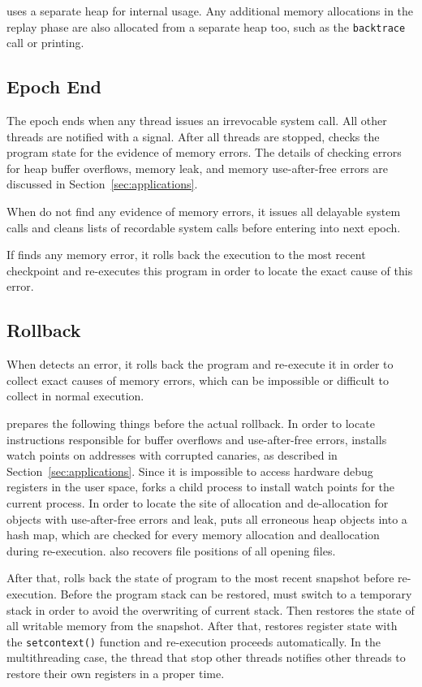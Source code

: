 \doubletake{} uses a separate heap for internal usage. Any additional memory allocations in the replay phase are also allocated from a separate heap too, such as the \texttt{backtrace} call or printing.

\subsection{Epoch End}
The epoch ends when any thread issues an irrevocable system
call. All other threads are notified with a signal. After all threads are stopped, \doubletake{} checks the program state for the evidence of memory errors. The details of checking errors for heap buffer overflows, memory leak, and memory use-after-free errors are discussed in Section~\ref{sec:applications}. 

When \doubletake{} do not find any evidence of memory errors, it issues all delayable system calls and cleans lists of recordable system calls before entering into next epoch.  
 
If \doubletake{} finds any memory error, it rolls back the execution to the most recent checkpoint and re-executes this program in order to locate the exact cause of this error. 

\subsection{Rollback}
\label{sec:rollback}
When \doubletake{} detects an error, it rolls back the program  and re-execute it in order to collect exact causes of memory errors, which can be impossible or difficult to collect in normal execution. 

\doubletake{} prepares the following things before the actual rollback. In order to locate instructions responsible for buffer overflows and use-after-free errors,
\doubletake{} installs watch points on addresses with corrupted canaries, as described in Section~\ref{sec:applications}.
Since it is impossible to access hardware debug registers in the user space, \doubletake{} forks a child process to install watch points for the current process.  
In order to locate the site of allocation and de-allocation for objects with use-after-free errors and leak, \doubletake{} puts  all erroneous heap objects into a hash map, which are checked for every memory allocation and deallocation during re-execution. \doubletake{} also recovers file positions of all opening files.

After that, \doubletake{} rolls back the state of program to the most recent snapshot before re-execution. Before the program stack can be restored, \doubletake{} must switch to a temporary stack in order to avoid the overwriting of current stack. Then \doubletake{} restores the state of all writable memory from the snapshot. After that, \doubletake{} restores register state with the \texttt{setcontext()} function and re-execution proceeds automatically.
In the multithreading case, the thread that stop other threads notifies other threads to restore their own registers in a proper time. 

